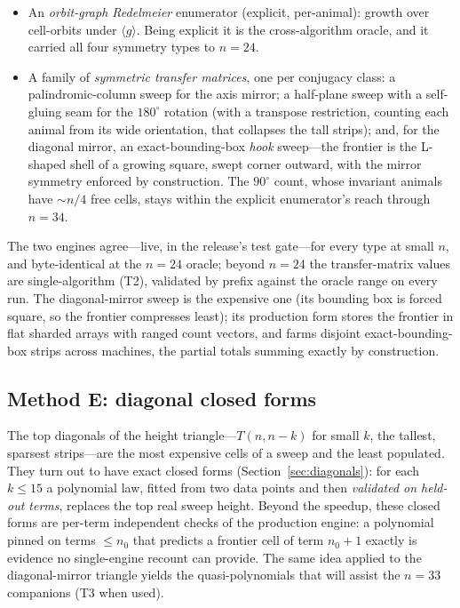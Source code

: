 \documentclass[11pt]{article}
\newcommand{\tiertwo}{\textsf{T2}}
\newcommand{\tierthree}{\textsf{T3}}
\begin{document}
\begin{itemize}
  \item An \emph{orbit-graph Redelmeier} enumerator (explicit, per-animal):
        growth over cell-orbits under $\langle g\rangle$. Being explicit it is
        the cross-algorithm oracle, and it carried all four symmetry types to
        $n=24$.
  \item A family of \emph{symmetric transfer matrices}, one per conjugacy
        class: a palindromic-column sweep for the axis mirror; a half-plane
        sweep with a self-gluing seam for the $180^\circ$ rotation (with a
        transpose restriction, counting each animal from its wide
        orientation, that collapses the tall strips); and, for the diagonal
        mirror, an exact-bounding-box \emph{hook} sweep---the frontier is the
        L-shaped shell of a growing square, swept corner outward, with the
        mirror symmetry enforced by construction. The $90^\circ$ count, whose
        invariant animals have $\sim n/4$ free cells, stays within the
        explicit enumerator's reach through $n=34$.
\end{itemize}

The two engines agree---live, in the release's test gate---for every type at
small $n$, and byte-identical at the $n=24$ oracle; beyond $n=24$ the
transfer-matrix values are single-algorithm (\tiertwo{}), validated by prefix
against the oracle range on every run. The diagonal-mirror sweep is the
expensive one (its bounding box is forced square, so the frontier compresses
least); its production form stores the frontier in flat sharded arrays with
ranged count vectors, and farms disjoint exact-bounding-box strips across
machines, the partial totals summing exactly by construction.

\subsection{Method E: diagonal closed forms}
\label{sec:methodE}

The top diagonals of the height triangle---$T(n,n-k)$ for small $k$, the
tallest, sparsest strips---are the most expensive cells of a sweep and the
least populated. They turn out to have exact closed forms
(Section~\ref{sec:diagonals}): for each $k\le15$ a polynomial law, fitted from
two data points and then \emph{validated on held-out terms}, replaces the top
real sweep height. Beyond the speedup, these closed forms are per-term
independent checks of the production engine: a polynomial pinned on terms
$\le n_0$ that predicts a frontier cell of term $n_0{+}1$ exactly is evidence
no single-engine recount can provide. The same idea applied to the
diagonal-mirror triangle yields the quasi-polynomials that will assist the
$n=33$ companions (\tierthree{} when used).
\end{document}
